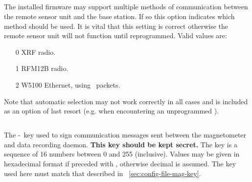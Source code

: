 \subsection{}
The installed firmware may support multiple methods of communication
between the remote sensor unit and the base station. If so this option
indicates which method should be used. It is vital that this setting
is correct otherwise the remote sensor unit will not function until
reprogrammed. Valid values are:
\begin{enumerate}
\item[0] XRF radio.
\item[1] RFM12B radio.
\item[2] W5100 Ethernet, using \udp\ packets.
\end{enumerate}
Note that automatic selection may not work correctly in all cases and
is included as an option of last resort (e.g. when encountering an
unprogrammed \eeprom).

\subsection{}
\label{sec:eeprom-hmac-key}
The \hmac-\mdfive\ key used to sign communication messages sent
between the magnetometer and data recording daemon. \textbf{This key
  should be kept secret.} The key is a sequence of 16 numbers between
0 and 255 (inclusive). Values may be given in hexadecimal format if
preceded with , otherwise decimal is assumed. The key used
here must match that described in
\secname~\ref{sec:config-file-mag-key}.



